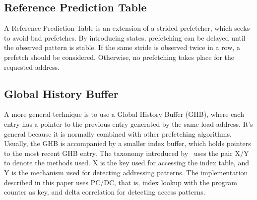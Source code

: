 \subsection{Reference Prediction Table}

A Reference Prediction Table is an extension of a strided prefetcher,
which seeks to avoid bad prefetches. By introducing states,
prefetching can be delayed until the observed pattern is stable. If
the same stride is observed twice in a row, a prefetch should be
considered. Otherwise, no prefetching takes place for the requested
address.

\subsection{Global History Buffer}

A more general technique is to use a Global History Buffer (GHB),
where each entry has a pointer to the previous entry generated by the
same load address. It's general because it is normally combined with
other prefetching algorithms. Usually, the GHB is accompanied by a
smaller index buffer, which holds pointers to the most recent GHB
entry. The taxonomy introduced by~\cite{nesbit_smith_2005} uses the
pair X/Y to denote the methods used. X is the key used for accessing
the index table, and Y is the mechanism used for detecting addressing
patterns. The implementation described in this paper uses PC/DC, that
is, index lookup with the program counter as key, and delta
correlation for detecting access patterns.
